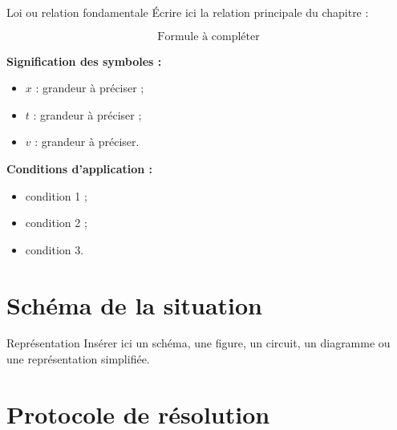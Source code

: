 \documentclass[11pt,a4paper]{article}
\begin{document}
\begin{cadrevert}{Loi ou relation fondamentale}
Écrire ici la relation principale du chapitre :

\[
\text{Formule à compléter}
\]

\medskip

\textbf{Signification des symboles :}
\begin{itemize}
    \item $x$ : grandeur à préciser ;
    \item $t$ : grandeur à préciser ;
    \item $v$ : grandeur à préciser.
\end{itemize}

\medskip

\textbf{Conditions d’application :}
\begin{itemize}
    \item condition 1 ;
    \item condition 2 ;
    \item condition 3.
\end{itemize}
\end{cadrevert}

\section{Schéma de la situation}

\begin{cadregris}{Représentation}
Insérer ici un schéma, une figure, un circuit, un diagramme ou une représentation simplifiée.

\medskip

\begin{center}
\end{center}
\end{cadregris}

\section{Protocole de résolution}
\end{document}
